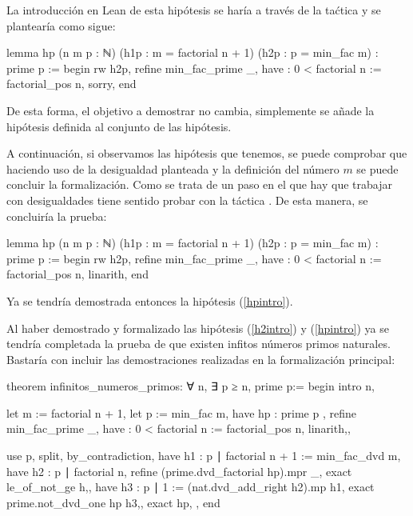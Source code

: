 \begin{itemize}
\begin{demostracion}
    La introducción en Lean de esta hipótesis se haría a través de la taćtica
     y se plantearía como sigue:
    \begin{leancode}
lemma hp
  (n m p : ℕ)
  (h1p : m = factorial n + 1)
  (h2p : p = min_fac m)
  : prime p :=
begin
  rw h2p,
  refine min_fac_prime _,
  have : 0 < factorial n := factorial_pos n,
  sorry,
end
    \end{leancode}

    De esta forma, el objetivo a demostrar no cambia, simplemente se añade la
    hipótesis definida al conjunto de las hipótesis.

    A continuación, si observamos las hipótesis que tenemos, se puede comprobar
    que haciendo uso de la desigualdad planteada y la definición del número
    \(m\) se puede concluir la formalización. Como se trata de un paso en el que
    hay que trabajar con desigualdades tiene sentido probar con la táctica
    . De esta manera, se concluiría la prueba:

    \begin{leancode}
lemma hp
  (n m p : ℕ)
  (h1p : m = factorial n + 1)
  (h2p : p = min_fac m)
  : prime p :=
begin
  rw h2p,
  refine min_fac_prime _,
  have : 0 < factorial n := factorial_pos n,
  linarith,
end
    \end{leancode}
    Ya se tendría demostrada entonces la hipótesis (\ref{hpintro}).
  \end{demostracion}
\end{itemize}

Al haber demostrado y formalizado las hipótesis (\ref{h2intro}) y
(\ref{hpintro}) ya se tendría completada la prueba de que existen infitos
números primos naturales. Bastaría con incluir las demostraciones realizadas
en la formalización principal:
\begin{leancode}
theorem infinitos_numeros_primos:
∀ n, ∃ p ≥ n, prime p:=
begin
  intro n,

  let m := factorial n + 1,
  let p := min_fac m,
  have hp : prime p ,
  { refine min_fac_prime _,
    have : 0 < factorial n := factorial_pos n,
    linarith,},

  use p,
  split,
  { by_contradiction,
    have h1 : p ∣ factorial n + 1 := min_fac_dvd m,
    have h2 : p ∣ factorial n,
    { refine (prime.dvd_factorial hp).mpr _,
      exact le_of_not_ge h,},
    have h3 : p ∣ 1 := (nat.dvd_add_right h2).mp h1,
    exact prime.not_dvd_one hp h3,},
  { exact hp, },
  end
\end{leancode}

